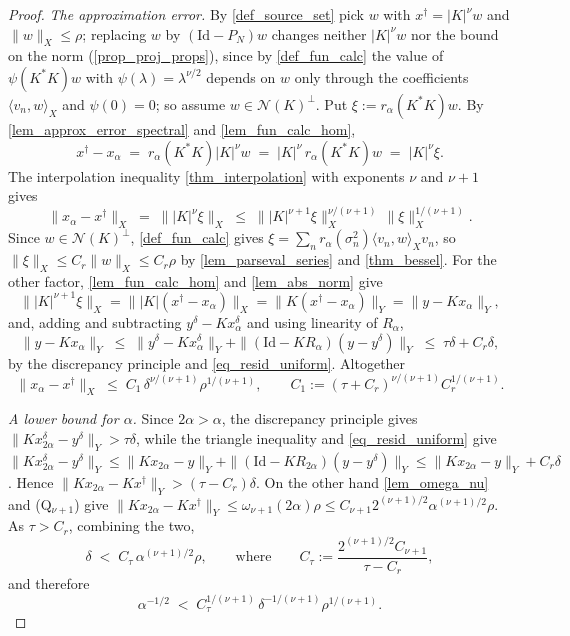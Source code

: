 \documentclass[a4paper]{report}
\theoremstyle{plain}
\theoremstyle{definition}
\theoremstyle{remark}
\newcommand{\Ker}{\mathcal{N}}
\newcommand{\Id}{\mathrm{Id}}
\newcommand{\dg}{^{\dagger}}
\begin{document}
\begin{proof}
  \emph{The approximation error.}  By \cref{def_source_set} pick $w$ with $x\dg =
  |K|^{\nu}w$ and $\|w\|_X \le \rho$; replacing $w$ by $(\Id - P_N)w$ changes neither
  $|K|^{\nu}w$ nor the bound on the norm (\cref{prop_proj_props}), since by
  \cref{def_fun_calc} the value of $\psi(K^{*}K)w$ with $\psi(\lambda) =
  \lambda^{\nu/2}$ depends on $w$ only through the coefficients $\langle v_n,w\rangle_X$
  and $\psi(0) = 0$; so assume $w \in \Ker(K)^{\perp}$.  Put $\xi := r_{\alpha}(K^{*}K)w$.
  By \cref{lem_approx_error_spectral} and \cref{lem_fun_calc_hom},
  \[
    x\dg - x_{\alpha} \;=\; r_{\alpha}(K^{*}K)|K|^{\nu}w
      \;=\; |K|^{\nu}\,r_{\alpha}(K^{*}K)w \;=\; |K|^{\nu}\xi .
  \]
  The interpolation inequality \cref{thm_interpolation} with exponents $\nu$ and $\nu+1$
  gives
  \[
    \|x_{\alpha} - x\dg\|_X \;=\; \||K|^{\nu}\xi\|_X \;\le\;
      \||K|^{\nu+1}\xi\|_X^{\nu/(\nu+1)}\,\|\xi\|_X^{1/(\nu+1)} .
  \]
  Since $w \in \Ker(K)^{\perp}$, \cref{def_fun_calc} gives $\xi = \sum_n
  r_{\alpha}(\sigma_n^{2})\langle v_n,w\rangle_X v_n$, so $\|\xi\|_X \le C_r\|w\|_X \le
  C_r\rho$ by \cref{lem_parseval_series} and \cref{thm_bessel}.  For the other factor,
  \cref{lem_fun_calc_hom} and \cref{lem_abs_norm} give
  \[
    \||K|^{\nu+1}\xi\|_X = \||K|(x\dg - x_{\alpha})\|_X = \|K(x\dg - x_{\alpha})\|_Y
      = \|y - Kx_{\alpha}\|_Y ,
  \]
  and, adding and subtracting $y^{\delta} - Kx^{\delta}_{\alpha}$ and using linearity of
  $R_{\alpha}$,
  \[
    \|y - Kx_{\alpha}\|_Y \;\le\; \|y^{\delta} - Kx^{\delta}_{\alpha}\|_Y
      + \|(\Id - KR_{\alpha})(y - y^{\delta})\|_Y
      \;\le\; \tau\delta + C_r\delta ,
  \]
  by the discrepancy principle and \eqref{eq_resid_uniform}.  Altogether
  \[
    \|x_{\alpha} - x\dg\|_X \;\le\; C_1\,\delta^{\nu/(\nu+1)}\rho^{1/(\nu+1)},
    \qquad C_1 := (\tau + C_r)^{\nu/(\nu+1)}C_r^{1/(\nu+1)} .
  \]

  \emph{A lower bound for $\alpha$.}  Since $2\alpha > \alpha$, the discrepancy
  principle gives $\|Kx^{\delta}_{2\alpha} - y^{\delta}\|_Y > \tau\delta$, while the
  triangle inequality and \eqref{eq_resid_uniform} give
  $\|Kx^{\delta}_{2\alpha} - y^{\delta}\|_Y \le \|Kx_{2\alpha} - y\|_Y +
  \|(\Id-KR_{2\alpha})(y-y^{\delta})\|_Y \le \|Kx_{2\alpha} - y\|_Y + C_r\delta$.  Hence
  $\|Kx_{2\alpha} - Kx\dg\|_Y > (\tau - C_r)\delta$.  On the other hand
  \cref{lem_omega_nu} and (Q$_{\nu+1}$) give $\|Kx_{2\alpha} - Kx\dg\|_Y \le
  \omega_{\nu+1}(2\alpha)\rho \le C_{\nu+1}2^{(\nu+1)/2}\alpha^{(\nu+1)/2}\rho$.
  As $\tau > C_r$, combining the two,
  \[
    \delta \;<\; C_{\tau}\,\alpha^{(\nu+1)/2}\rho, \qquad\text{where}\qquad
      C_{\tau} := \frac{2^{(\nu+1)/2}C_{\nu+1}}{\tau - C_r} ,
  \]
  and therefore
  \[
    \alpha^{-1/2} \;<\; C_{\tau}^{1/(\nu+1)}\,\delta^{-1/(\nu+1)}\rho^{1/(\nu+1)} .
  \]


\end{proof}
\end{document}
